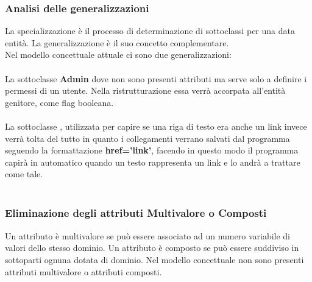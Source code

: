 \documentclass{article}
\begin{document}
{	{\subsubsection{Analisi delle generalizzazioni}}
	La specializzazione è il processo di determinazione di sottoclassi per una data
	entità. La generalizzazione è il suo concetto complementare. \\
	Nel modello concettuale attuale ci sono due generalizzazioni: \\\\
	La sottoclasse \textbf{Admin} dove non sono presenti attributi ma serve solo a definire i permessi di un utente. Nella ristrutturazione essa verr\`a accorpata all'entit\`a genitore, come flag booleana. \\\\
	La sottoclasse , utilizzata per capire se una riga di testo era anche un link invece verr\`a tolta del tutto in quanto i collegamenti verrano salvati dal programma seguendo la formattazione \textbf{href='link'}, facendo in questo modo il programma capirà in automatico quando un testo rappresenta un link e lo andrà a trattare come tale.\\\\
	
	
	{\subsubsection{Eliminazione degli attributi Multivalore o Composti}}
	Un attributo è multivalore se può essere associato ad un numero variabile di
	valori dello stesso dominio. Un attributo è composto se può essere suddiviso
	in sottoparti ognuna dotata di dominio.
	Nel modello concettuale non sono presenti attributi multivalore o attributi composti. \\\\
	
}
\end{document}
